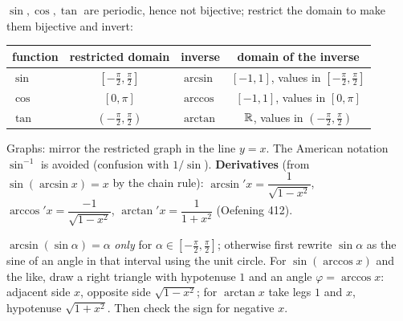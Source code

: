 \begin{key}
$\sin,\cos,\tan$ are periodic, hence not bijective; restrict the domain to make them bijective and invert:
\begin{center}\small
\begin{tabular}{l|c|l|c}
function & restricted domain & inverse & domain of the inverse\\\hline
$\sin$ & $[-\frac\pi2,\frac\pi2]$ & $\arcsin$ & $[-1,1]$, values in $[-\frac\pi2,\frac\pi2]$\\
$\cos$ & $[0,\pi]$ & $\arccos$ & $[-1,1]$, values in $[0,\pi]$\\
$\tan$ & $(-\frac\pi2,\frac\pi2)$ & $\arctan$ & $\mathbb{R}$, values in $(-\frac\pi2,\frac\pi2)$
\end{tabular}
\end{center}
Graphs: mirror the restricted graph in the line $y=x$. The American notation $\sin^{-1}$ is avoided (confusion with $1/\sin$). \textbf{Derivatives} (from $\sin(\arcsin x)=x$ by the chain rule): $\arcsin'x=\dfrac1{\sqrt{1-x^2}}$, $\arccos'x=\dfrac{-1}{\sqrt{1-x^2}}$, $\arctan'x=\dfrac1{1+x^2}$ (Oefening 412).
\end{key}
\begin{strategy}
$\arcsin(\sin\alpha)=\alpha$ \emph{only} for $\alpha\in[-\frac\pi2,\frac\pi2]$; otherwise first rewrite $\sin\alpha$ as the sine of an angle in that interval using the unit circle. For $\sin(\arccos x)$ and the like, draw a right triangle with hypotenuse $1$ and an angle $\varphi=\arccos x$: adjacent side $x$, opposite side $\sqrt{1-x^2}$; for $\arctan x$ take legs $1$ and $x$, hypotenuse $\sqrt{1+x^2}$. Then check the sign for negative $x$.
\end{strategy}

